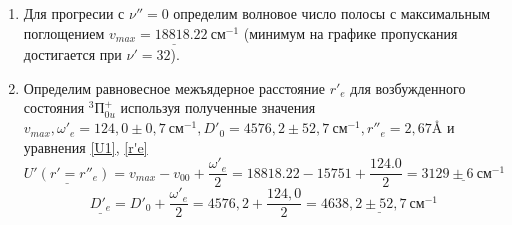 \documentclass{article}
\begin{document}
\begin{enumerate}
\begin{enumerate}
\begin{figure}[h!]
    \caption{Экстраполяция Берджа-Шпонер}
    \label{fig:I2-berdg}
\end{figure}
Коэффициенты апроксимации параболой:
\begin{equation*}
    a = 116 \pm 5~см^{-1},\text{  } b= -0.8 \pm 0.5~см^{-1},\text{  } c = -0.024 \pm 0.012~см^{-1} 
\end{equation*}
    Согласно \hyperref[D0 berdj shnop]{уравнению \ref*{D0 berdj shnop}} площадь под этой кривой соответствует энергии диссоциации, то есть
    \begin{equation*}
         для~y = \Delta G'_{\nu'+0.5}, ~~ x = \nu'+0.5,~~имеем~ y = cx^2+bx+a,~пересекающую ~ось~ абсцисс~ в ~x_0 = 54,8
    \end{equation*}
    \begin{equation*}
    \Rightarrow \fbox{ D'_0= \frac{c x_0^3}{3}+\frac{b x_0^2}{2}+a x_0 = 3939,1\pm 1035,4~см^{-1}}
    \end{equation*}
    \begin{equation*}
        \delta D'_0 = \sqrt{\left( \frac{x_0^3}{3}\cdot \delta c\right)^2+\left( \frac{x_0^2}{2}\cdot \delta b\right)^2 + \left(x_0 \cdot \delta a\right)^2} = 1035,4~см^{-1} 
    \end{equation*}
\end{enumerate}
 Определим энергию диссоциции основного состояния $^1\sum^+_g$ 
 \begin{equation*}
     \fbox{D''_0 = v_{гр} - E_a = 19000 - 7603 = 11397 \pm 2000~см^{-1}} 
 \end{equation*}
 \item Для прогресии с $\nu'' = 0$ определим волновое число полосы с максимальным поглощением $\underline{v_{max} = 18818.22~см^{-1}}$ (минимум на графике пропускания достигается при $\nu' = 32$). 
 \item Определим равновесное межъядерное расстояние $r'_e$ для возбужденного состояния $^3П^+_{0u}$ используя полученные значения $v_{max}, \omega'_e = 124,0 \pm 0,7~см^{-1}, D'_0 = 4576,2 \pm 52,7~см^{-1}, r''_e = 2,67 \text{\AA}$ и уравнения \hyperref[U1]{ \ref*{U1}}, \hyperref[r'e]{ \ref*{r'e}}
 \begin{equation*}
     \underline{U'(r'= r''_e)} = v_{max} - v_{00} + \frac{\omega'_e}{2} = 18818.22 - 15751 + \frac{124.0}{2} = \underline{3129 \pm 6~см^{-1}}
 \end{equation*}
 \begin{equation*}
     \underline{D'_e} = D'_0 + \frac{\omega'_e}{2} =  4576,2 + \frac{ 124,0}{2} = \underline{4638,2 \pm 52,7~см^{-1}}
 \end{equation*}

\end{enumerate}
\end{document}
